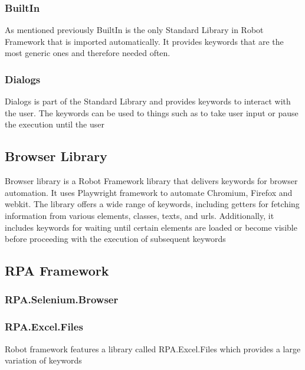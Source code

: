 \subsubsection{BuiltIn}
As mentioned previously BuiltIn is the only Standard Library in Robot Framework that is imported automatically.
It provides keywords that are the most generic ones and therefore needed often.
\subsubsection{Dialogs}
Dialogs is part of the Standard Library and provides keywords to interact with the user. The keywords can be used to things such as to take user input or pause the execution until the user 
\subsection{Browser Library}
Browser library is a Robot Framework library that delivers keywords for browser automation.
It uses Playwright framework to automate Chromium, Firefox and webkit.
The library offers a wide range of keywords, including getters for fetching information from various elements, classes, texts, and \gls{url}s.
Additionally, it includes keywords for waiting until certain elements are loaded or become visible before proceeding with the execution of subsequent keywords
\subsection{RPA Framework}
\subsubsection{RPA.Selenium.Browser}
\subsubsection{RPA.Excel.Files}
Robot framework features a library called RPA.Excel.Files which provides a large variation of keywords
\cite{robot-framework:standard-library}
\cite{robot_framework:builtin_library}
\cite{robot_framework:dialogs_library}
\cite{robot_framework:browser_library}
\clearpage %
